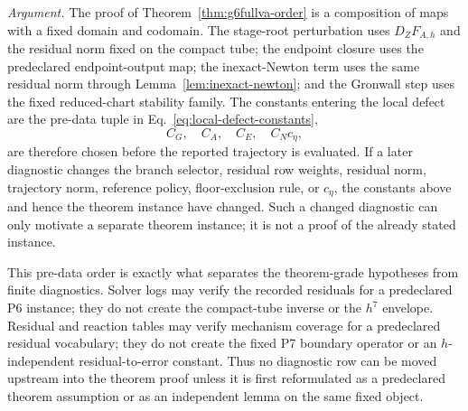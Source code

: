\documentclass[preprint,12pt]{elsarticle}
\begin{document}
\noindent\emph{Argument.}
The proof of Theorem~\ref{thm:g6fullva-order} is a composition of maps with a
fixed domain and codomain.  The stage-root perturbation uses
\(D_ZF_{A,h}\) and the residual norm fixed on the compact tube; the endpoint
closure uses the predeclared endpoint-output map; the inexact-Newton term
uses the same residual norm through Lemma~\ref{lem:inexact-newton}; and the
Gronwall step uses the fixed reduced-chart stability family.  The constants
entering the local defect are the pre-data tuple in
Eq.~\eqref{eq:local-defect-constants},
\begin{equation}
\label{eq:local-defect-constants}
  C_G,\quad C_A,\quad C_E,\quad C_Nc_\eta ,
\end{equation}
are therefore chosen before the reported trajectory is evaluated.  If a later
diagnostic changes the branch selector, residual row weights, residual norm,
trajectory norm, reference policy, floor-exclusion rule, or \(c_\eta\), the
constants above and hence the theorem instance have changed.  Such a changed
diagnostic can only motivate a separate theorem instance; it is not a proof of the
already stated instance.

This pre-data order is exactly what separates the theorem-grade hypotheses
from finite diagnostics.  Solver logs may verify the recorded residuals for a
predeclared P6 instance; they do not create the compact-tube inverse or the
\(h^7\) envelope.  Residual and reaction tables may verify mechanism
coverage for a predeclared residual vocabulary; they do not create the fixed
P7 boundary operator or an \(h\)-independent residual-to-error constant.
Thus no diagnostic row can be moved upstream into the theorem proof unless it
is first reformulated as a predeclared theorem assumption or as an independent
lemma on the same fixed object.
\end{document}
